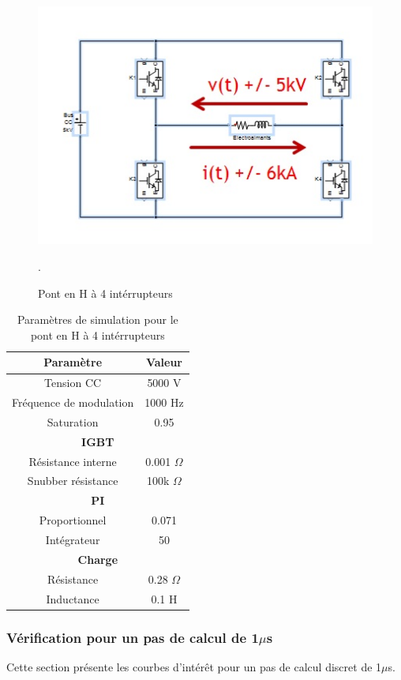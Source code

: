 \documentclass[11pt,letterpaper,final]{report}
\begin{document}
\begin{figure}[htb]
\centering
\includegraphics[scale=1]{Fig/Hacheur4Quadrants/Hacheur.jpg}
\caption{Pont en H à 4 intérrupteurs}.
\label{hach}
\end{figure}

\begin{table}[htb]
\centering
\begin{tabular}{|c|c|} 
  \hline
  \textbf{Paramètre} & \textbf{Valeur}  \\
  \hline\hline
  Tension CC & 5000 V\\ \hline
  Fréquence de modulation & 1000 Hz\\ \hline
  Saturation & 0.95 \\ \hline \hline
  \multicolumn{2}{|c|}{\textbf{IGBT}}\\ \hline
  Résistance interne & 0.001 $\Omega$\\
  Snubber résistance & 100k $\Omega$\\ \hline \hline
   \multicolumn{2}{|c|}{\textbf{PI}}\\ \hline
  Proportionnel & 0.071 \\
  Intégrateur & 50 \\ \hline \hline
  \multicolumn{2}{|c|}{\textbf{Charge}}\\ \hline
  Résistance & 0.28 $\Omega$\\
  Inductance & 0.1 H\\
  \hline
\end{tabular}
\caption{Paramètres de simulation pour le pont en H à 4 intérrupteurs}
\label{p_hash}
\end{table}

\subsubsection{Vérification pour un pas de calcul de 1$\mu$s}
Cette section présente les courbes d'intérêt pour un pas de calcul discret de 1$\mu$s. 
\end{document}
